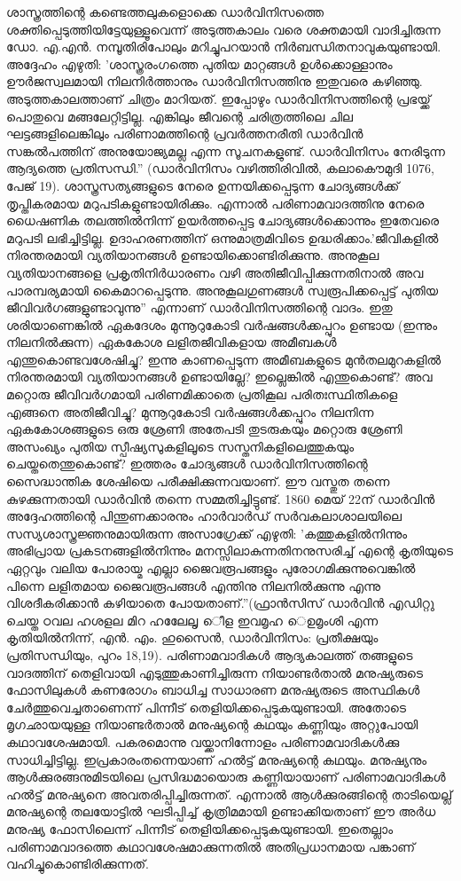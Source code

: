 ശാസ്ത്രത്തിന്റെ കണ്ടെത്തലുകളൊക്കെ ഡാര്‍വിനിസത്തെ ശക്തിപ്പെടുത്തിയിട്ടേയുള്ളൂവെന്ന് അടുത്തകാലം വരെ ശക്തമായി വാദിച്ചിരുന്ന ഡോ. എ.എന്‍. നമ്പൂതിരിപോലും മറിച്ചുപറയാന്‍ നിര്‍ബന്ധിതനാവുകയുണ്ടായി. അദ്ദേഹം എഴുതി: 'ശാസ്ത്രരംഗത്തെ പുതിയ മാറ്റങ്ങള്‍ ഉള്‍ക്കൊള്ളാനും ഊര്‍ജസ്വലമായി നിലനിര്‍ത്താനും ഡാര്‍വിനിസത്തിനു ഇതുവരെ കഴിഞ്ഞു. അടുത്തകാലത്താണ് ചിത്രം മാറിയത്. ഇപ്പോഴും ഡാര്‍വിനിസത്തിന്റെ പ്രഭയ്ക്ക് പൊതുവെ മങ്ങലേറ്റിട്ടില്ല. എങ്കിലും ജീവന്റെ ചരിത്രത്തിലെ ചില ഘട്ടങ്ങളിലെങ്കിലും പരിണാമത്തിന്റെ പ്രവര്‍ത്തനരീതി ഡാര്‍വിന്‍ സങ്കല്‍പത്തിന് അനുയോജ്യമല്ല എന്ന സൂചനകളുണ്ട്. ഡാര്‍വിനിസം നേരിടുന്ന ആദ്യത്തെ പ്രതിസന്ധി.'' (ഡാര്‍വിനിസം വഴിത്തിരിവില്‍, കലാകൌമുദി 1076, പേജ് 19).
ശാസ്ത്രസത്യങ്ങളുടെ നേരെ ഉന്നയിക്കപ്പെടുന്ന ചോദ്യങ്ങള്‍ക്ക് തൃപ്തികരമായ മറുപടികളുണ്ടായിരിക്കും. എന്നാല്‍ പരിണാമവാദത്തിനു നേരെ ധൈഷണിക തലത്തില്‍നിന്ന് ഉയര്‍ത്തപ്പെട്ട ചോദ്യങ്ങള്‍ക്കൊന്നും ഇതേവരെ മറുപടി ലഭിച്ചിട്ടില്ല. ഉദാഹരണത്തിന് ഒന്നുമാത്രമിവിടെ ഉദ്ധരിക്കാം.'ജീവികളില്‍ നിരന്തരമായി വ്യതിയാനങ്ങള്‍ ഉണ്ടായിക്കൊണ്ടിരിക്കുന്നു. അനുകൂല വ്യതിയാനങ്ങളെ പ്രകൃതിനിര്‍ധാരണം വഴി അതിജീവിപ്പിക്കുന്നതിനാല്‍ അവ പാരമ്പര്യമായി കൈമാറപ്പെടുന്നു. അനുകൂലഗുണങ്ങള്‍ സ്വരൂപിക്കപ്പെട്ട് പുതിയ ജീവിവര്‍ഗങ്ങളുണ്ടാവുന്നു'' എന്നാണ് ഡാര്‍വിനിസത്തിന്റെ വാദം. ഇതു ശരിയാണെങ്കില്‍ ഏകദേശം മുന്നൂറുകോടി വര്‍ഷങ്ങള്‍ക്കപ്പുറം ഉണ്ടായ (ഇന്നും നിലനില്‍ക്കുന്ന) ഏകകോശ ലളിതജീവികളായ അമീബകള്‍ എന്തുകൊണ്ടവശേഷിച്ചു? ഇന്നു കാണപ്പെടുന്ന അമീബകളുടെ മുന്‍തലമുറകളില്‍ നിരന്തരമായി വ്യതിയാനങ്ങള്‍ ഉണ്ടായില്ലേ? ഇല്ലെങ്കില്‍ എന്തുകൊണ്ട്? അവ മറ്റൊരു ജീവിവര്‍ഗമായി പരിണമിക്കാതെ പ്രതികൂല പരിതഃസ്ഥിതികളെ എങ്ങനെ അതിജീവിച്ചു? മുന്നൂറുകോടി വര്‍ഷങ്ങള്‍ക്കപ്പുറം നിലനിന്ന ഏകകോശങ്ങളുടെ ഒരു ശ്രേണി അതേപടി തുടരുകയും മറ്റൊരു ശ്രേണി അസംഖ്യം പുതിയ സ്പീഷ്യസുകളിലൂടെ സസ്തനികളിലെത്തുകയും ചെയ്തതെന്തുകൊണ്ട്? ഇത്തരം ചോദ്യങ്ങള്‍ ഡാര്‍വിനിസത്തിന്റെ സൈദ്ധാന്തിക ശേഷിയെ പരീക്ഷിക്കുന്നവയാണ്. ഈ വസ്തുത തന്നെ കുഴക്കുന്നതായി ഡാര്‍വിന്‍ തന്നെ സമ്മതിച്ചിട്ടുണ്ട്. 1860 മെയ് 22ന് ഡാര്‍വിന്‍ അദ്ദേഹത്തിന്റെ പിന്തുണക്കാരനും ഹാര്‍വാര്‍ഡ് സര്‍വകലാശാലയിലെ സസ്യശാസ്ത്രജ്ഞനുമായിരുന്ന അസാഗ്രേക്ക് എഴുതി: 'കത്തുകളില്‍നിന്നും അഭിപ്രായ പ്രകടനങ്ങളില്‍നിന്നും മനസ്സിലാകുന്നതിനനുസരിച്ച് എന്റെ കൃതിയുടെ ഏറ്റവും വലിയ പോരായ്മ എല്ലാ ജൈവരൂപങ്ങളും പുരോഗമിക്കുന്നുവെങ്കില്‍ പിന്നെ ലളിതമായ ജൈവരൂപങ്ങള്‍ എന്തിനു നിലനില്‍ക്കുന്നു എന്നു വിശദീകരിക്കാന്‍ കഴിയാതെ പോയതാണ്.''(ഫ്രാന്‍സിസ് ഡാര്‍വിന്‍ എഡിറ്റു ചെയ്ത ഠവല ഹശളല മിറ ഹലേേലൃ െീള ഇവമൃഹ െഉമൃംശി എന്ന കൃതിയില്‍നിന്ന്, എന്‍. എം. ഹുസൈന്‍, ഡാര്‍വിനിസം: പ്രതീക്ഷയും പ്രതിസന്ധിയും, പുറം 18,19).
പരിണാമവാദികള്‍ ആദ്യകാലത്ത് തങ്ങളുടെ വാദത്തിന് തെളിവായി എടുത്തുകാണിച്ചിരുന്ന നിയാണ്ടര്‍താല്‍ മനുഷ്യരുടെ ഫോസിലുകള്‍ കണരോഗം ബാധിച്ച സാധാരണ മനുഷ്യരുടെ അസ്ഥികള്‍ ചേര്‍ത്തുവെച്ചതാണെന്ന് പിന്നീട് തെളിയിക്കപ്പെടുകയുണ്ടായി. അതോടെ മൃഗഛായയുള്ള നിയാണ്ടര്‍താല്‍ മനുഷ്യന്റെ കഥയും കണ്ണിയും അറ്റുപോയി കഥാവശേഷമായി. പകരമൊന്നു വയ്ക്കാനിന്നോളം പരിണാമവാദികള്‍ക്കു സാധിച്ചിട്ടില്ല. ഇപ്രകാരംതന്നെയാണ് ഹല്‍ട്ട് മനുഷ്യന്റെ കഥയും. മനുഷ്യനും ആള്‍ക്കുരങ്ങനുമിടയിലെ പ്രസിദ്ധമായൊരു കണ്ണിയായാണ് പരിണാമവാദികള്‍ ഹല്‍ട്ട് മനുഷ്യനെ അവതരിപ്പിച്ചിരുന്നത്. എന്നാല്‍ ആള്‍ക്കുരങ്ങിന്റെ താടിയെല്ല് മനുഷ്യന്റെ തലയോട്ടില്‍ ഘടിപ്പിച്ച് കൃത്രിമമായി ഉണ്ടാക്കിയതാണ് ഈ അര്‍ധ മനുഷ്യ ഫോസിലെന്ന് പിന്നീട് തെളിയിക്കപ്പെടുകയുണ്ടായി. ഇതെല്ലാം പരിണാമവാദത്തെ കഥാവശേഷമാക്കുന്നതില്‍ അതിപ്രധാനമായ പങ്കാണ് വഹിച്ചുകൊണ്ടിരിക്കുന്നത്.
